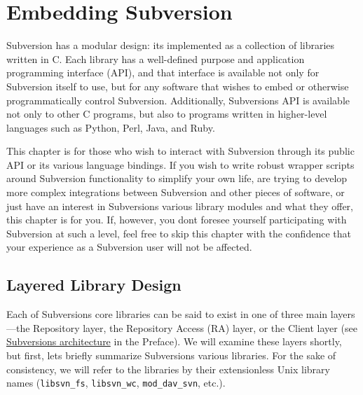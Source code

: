 \chapter{Embedding Subversion}\label{svn.developer}

Subversion has a modular design: it\textquotesingle s implemented as a
collection of libraries written in C. Each library has a well-defined
purpose and application programming interface (API), and that interface
is available not only for Subversion itself to use, but for any software
that wishes to embed or otherwise programmatically control Subversion.
Additionally, Subversion\textquotesingle s API is available not only to
other C programs, but also to programs written in higher-level languages
such as Python, Perl, Java, and Ruby.

This chapter is for those who wish to interact with Subversion through
its public API or its various language bindings. If you wish to write
robust wrapper scripts around Subversion functionality to simplify your
own life, are trying to develop more complex integrations between
Subversion and other pieces of software, or just have an interest in
Subversion\textquotesingle s various library modules and what they
offer, this chapter is for you. If, however, you don\textquotesingle t
foresee yourself participating with Subversion at such a level, feel
free to skip this chapter with the confidence that your experience as a
Subversion user will not be affected.

\section{Layered Library Design}\label{svn.developer.layerlib}

Each of Subversion\textquotesingle s core libraries can be said to exist
in one of three main layers---the Repository layer, the Repository
Access (RA) layer, or the Client layer (see
\hyperref[svn.intro.architecture.dia-1]{Subversion\textquotesingle s
architecture} in the Preface). We will examine these layers shortly, but
first, let\textquotesingle s briefly summarize
Subversion\textquotesingle s various libraries. For the sake of
consistency, we will refer to the libraries by their extensionless Unix
library names (\texttt{libsvn\_fs}, \texttt{libsvn\_wc},
\texttt{mod\_dav\_svn}, etc.).

